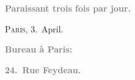 \pstart
           \begin{otherlanguage}{french}\textcolor{gray}{\textbf{\textbf{Paraissant trois fois par jour.}}}\end{otherlanguage}\hfill \textsc{Paris}, 3. April.\pend
           
\pstart
           \begin{otherlanguage}{french}\textcolor{gray}{\textbf{\textbf{Bureau à Paris:}}}\end{otherlanguage}\pend
           
\pstart
           \begin{otherlanguage}{french}\textcolor{gray}{\textbf{\textbf{24. Rue Feydeau.}}}\end{otherlanguage}\pend
           
